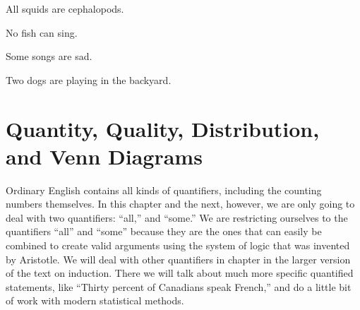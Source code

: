 \begin{exercises}
\item All squids are cephalopods. 


\item No fish can sing.


\item Some songs are sad.


\item Two dogs are playing in the backyard.


\end{exercises}



\section{Quantity, Quality, Distribution, and Venn Diagrams}
\label{sec:QQDVD}
Ordinary English contains all kinds of quantifiers, including the counting numbers themselves. In this chapter and the next, however, we are only going to deal with two quantifiers: ``all,'' and ``some.'' We are restricting ourselves to the quantifiers ``all'' and ``some'' because they are the ones that can easily be combined to create valid arguments using the system of logic that was invented by Aristotle. We will deal with other quantifiers in chapter in the larger version of the text on induction. \label{ver_var}  There we will talk about much more specific quantified statements, like ``Thirty percent of Canadians speak French,'' and do a little bit of work with modern statistical methods. 

